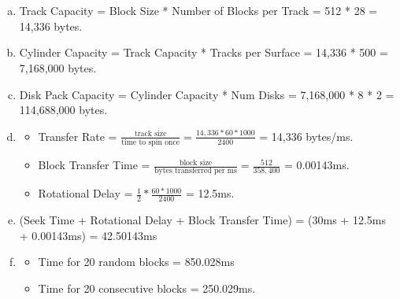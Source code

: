 \documentclass[12pt]{article}
\newcounter{num}
\begin{document}
\section{}
\begin{enumerate}[a.]
    \item Track Capacity = Block Size * Number of Blocks per Track = 512 * 28 = 14,336 bytes.
    \item Cylinder Capacity = Track Capacity * Tracks per Surface = 14,336 * 500 = 7,168,000 bytes.
    \item Disk Pack Capacity = Cylinder Capacity * Num Disks = 7,168,000 * 8 * 2 = 114,688,000 bytes.
    \item 
    \begin{itemize}
        \item Transfer Rate = $\frac{\textrm{track size}}{\textrm{time to spin once}} =  \frac{14,336 * 60 * 1000}{2400}$ = 14,336 bytes/ms.
        \item Block Transfer Time = $\frac{\textrm{block size}}{\textrm{bytes transferred per ms}} = \frac{512}{358,400}$ = 0.00143ms.
        \item Rotational Delay = $\frac{1}{2} * \frac{60*1000}{2400}$ = 12.5ms.
    \end{itemize}
    \item (Seek Time + Rotational Delay + Block Transfer Time) = (30ms + 12.5ms + 0.00143ms) = 42.50143ms
    \item 
        \begin{itemize}
            \item Time for 20 random blocks = 850.028ms
            \item Time for 20 consecutive blocks = 250.029ms.
        \end{itemize}
\end{enumerate}
\newpage
\end{document}

